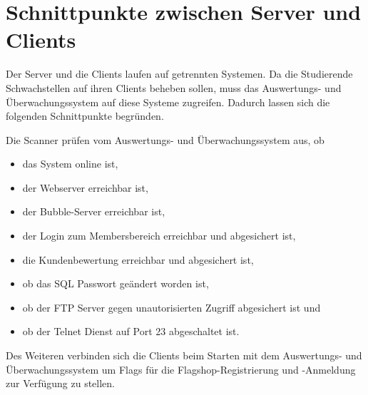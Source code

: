 \section{Schnittpunkte zwischen Server und Clients}
\label{sec:Schnittpunkte_zwischen_Server_und_Clients}

Der Server und die Clients laufen auf getrennten Systemen. Da die Studierende Schwachstellen auf ihren Clients beheben sollen, muss das Auswertungs- und Überwachungssystem auf diese Systeme zugreifen. Dadurch lassen sich die folgenden Schnittpunkte begründen.

Die Scanner prüfen vom Auswertungs- und Überwachungssystem aus, ob 
\begin{itemize}
	\item das System online ist,
	\item der Webserver erreichbar ist,
	\item der Bubble-Server erreichbar ist,
	\item der Login zum Membersbereich erreichbar und abgesichert ist,
	\item die Kundenbewertung erreichbar und abgesichert ist,
	\item ob das SQL Passwort geändert worden ist,
	\item ob der FTP Server gegen unautorisierten Zugriff abgesichert ist und
	\item ob der Telnet Dienst auf Port 23 abgeschaltet ist. 
\end{itemize}

Des Weiteren verbinden sich die Clients beim Starten mit dem Auswertungs- und Überwachungssystem um Flags für die Flagshop-Registrierung und -Anmeldung zur Verfügung zu stellen.